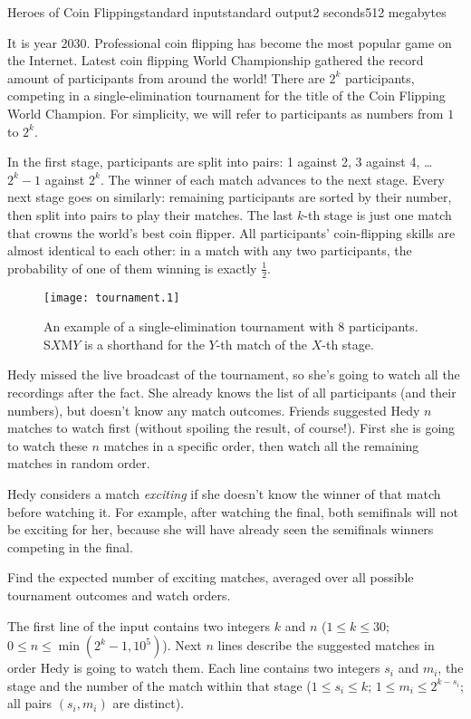 \begin{problem}{Heroes of Coin Flipping}{standard input}{standard output}{2 seconds}{512 megabytes}

It is year 2030. Professional coin flipping has become the most popular game on the Internet. Latest coin flipping World Championship gathered the record amount of participants from around the world! There are $2^k$ participants, competing in a single-elimination tournament for the title of the Coin Flipping World Champion. For simplicity, we will refer to participants as numbers from $1$ to $2^k$.

In the first stage, participants are split into pairs: 1 against 2, 3 against 4, \ldots $2^k - 1$ against $2^k$. The winner of each match advances to the next stage. Every next stage goes on similarly: remaining participants are sorted by their number, then split into pairs to play their matches. The last $k$-th stage is just one match that crowns the world's best coin flipper. All participants' coin-flipping skills are almost identical to each other: in a match with any two participants, the probability of one of them winning is exactly $\frac 12$.

\begin{figure}[h!]
\begin{center}
\texttt{[image: tournament.1]}
\end{center}
\caption*{An example of a single-elimination tournament with 8 participants. S$X$M$Y$ is a shorthand for the $Y$-th match of the $X$-th stage.}
\end{figure}

Hedy missed the live broadcast of the tournament, so she's going to watch all the recordings after the fact. She already knows the list of all participants (and their numbers), but doesn't know any match outcomes. Friends suggested Hedy $n$ matches to watch first (without spoiling the result, of course!). First she is going to watch these $n$ matches in a specific order, then watch all the remaining matches in random order.

Hedy considers a match \textit{exciting} if she doesn't know the winner of that match before watching it. For example, after watching the final, both semifinals will not be exciting for her, because she will have already seen the semifinals winners competing in the final. 

Find the expected number of exciting matches, averaged over all possible tournament outcomes and watch orders.

\InputFile
The first line of the input contains two integers $k$ and $n$ ($1 \le k \le 30$; $0 \le n \le \min(2^k - 1, 10^5)$).
Next $n$ lines describe the suggested matches in order Hedy is going to watch them. Each line contains two integers $s_i$ and $m_i$, the stage and the number of the match within that stage ($1 \le s_i \le k$; $1 \le m_i \le 2^{k-s_i}$; all pairs $(s_i, m_i)$ are distinct).



\end{problem}
